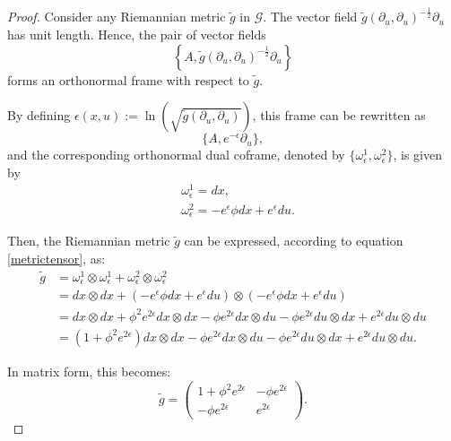 \documentclass{article}
\theoremstyle{remark}
\theoremstyle{definition}
\begin{document}
\begin{proof}
Consider any Riemannian metric $\tilde{g}$ in $\mathcal{G}$. The vector field $ \tilde{g}(\partial_u,\partial_u)^{-\frac{1}{2}} \partial_u$ has unit length. Hence, the pair of vector fields 
$$
\left\{A, \tilde{g}(\partial_u,\partial_u)^{-\frac{1}{2}} \partial_u\right\}
$$
forms an orthonormal frame with respect to $\tilde{g}$.

By defining $\epsilon(x,u):=\ln \left(\sqrt{\tilde{g}(\partial_u,\partial_u)}\right)$, this frame can be rewritten as
\begin{equation}\label{eq:ortframe}
\{A,e^{-\epsilon}\partial_u\},
\end{equation}
and the corresponding orthonormal dual coframe, denoted by $\{\omega_{\epsilon}^1,\omega_{\epsilon}^2\}$, is given by
\begin{equation}\label{eq:cofdef}
\begin{aligned}
& \omega_{\epsilon}^1=dx,
\\
& \omega_{\epsilon}^2=-e^\epsilon \phi dx+e^\epsilon du.
\end{aligned}    
\end{equation}


Then, the Riemannian metric $\tilde{g}$ can be expressed, according to equation \eqref{metrictensor}, as:
\[
\begin{aligned}
\tilde{g} &= \omega_{\epsilon}^1 \otimes \omega_{\epsilon}^1 + \omega_{\epsilon}^2 \otimes \omega_{\epsilon}^2\\
&= dx \otimes dx + \left(-e^\epsilon \phi dx+e^\epsilon du\right) \otimes \left(-e^\epsilon \phi dx+e^\epsilon du\right)\\
&= dx \otimes dx + \phi^2 e^{2\epsilon} dx \otimes dx - \phi e^{2\epsilon} dx \otimes du - \phi e^{2\epsilon} du \otimes dx + e^{2\epsilon} du \otimes du\\
&= (1 + \phi^2 e^{2\epsilon}) dx \otimes dx - \phi e^{2\epsilon} dx \otimes du - \phi e^{2\epsilon} du \otimes dx + e^{2\epsilon} du \otimes du.
\end{aligned}
\]

In matrix form, this becomes:
\begin{equation}\label{metrigepsilon}
    \tilde{g}= \begin{pmatrix}
        1+ \phi^2 e^{2\epsilon} & -\phi e^{2\epsilon}\\
        - \phi e^{2\epsilon}  & e^{2\epsilon}
        \end{pmatrix}.    
\end{equation}

\end{proof}
\end{document}
